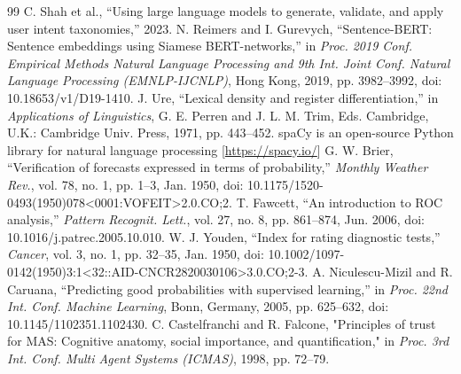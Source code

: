 \documentclass[conference]{IEEEtran}
\begin{document}
\begin{thebibliography}{99}
 C. Shah et al., ``Using large language models to generate, validate, and apply user intent taxonomies,'' 2023.
 N. Reimers and I. Gurevych, ``Sentence-BERT: Sentence embeddings using Siamese BERT-networks,'' in \textit{Proc. 2019 Conf. Empirical Methods Natural Language Processing and 9th Int. Joint Conf. Natural Language Processing (EMNLP-IJCNLP)}, Hong Kong, 2019, pp. 3982–3992, doi: 10.18653/v1/D19-1410.
 J. Ure, ``Lexical density and register differentiation,'' in \textit{Applications of Linguistics}, G. E. Perren and J. L. M. Trim, Eds. Cambridge, U.K.: Cambridge Univ. Press, 1971, pp. 443–452.
 spaCy is an open-source Python library for natural language processing [\url{https://spacy.io/}]
 G. W. Brier, ``Verification of forecasts expressed in terms of probability,'' \textit{Monthly Weather Rev.}, vol. 78, no. 1, pp. 1–3, Jan. 1950, doi: 10.1175/1520-0493(1950)078<0001:VOFEIT>2.0.CO;2.
 T. Fawcett, ``An introduction to ROC analysis,'' \textit{Pattern Recognit. Lett.}, vol. 27, no. 8, pp. 861–874, Jun. 2006, doi: 10.1016/j.patrec.2005.10.010.
 W. J. Youden, ``Index for rating diagnostic tests,'' \textit{Cancer}, vol. 3, no. 1, pp. 32–35, Jan. 1950, doi: 10.1002/1097-0142(1950)3:1<32::AID-CNCR2820030106>3.0.CO;2-3.
 A. Niculescu-Mizil and R. Caruana, ``Predicting good probabilities with supervised learning,'' in \textit{Proc. 22nd Int. Conf. Machine Learning}, Bonn, Germany, 2005, pp. 625–632, doi: 10.1145/1102351.1102430.
 C. Castelfranchi and R. Falcone, "Principles of trust for MAS: Cognitive anatomy, social importance, and quantification," in \textit {Proc. 3rd Int. Conf. Multi Agent Systems (ICMAS)}, 1998, pp. 72–79.

\end{thebibliography}
\end{document}
